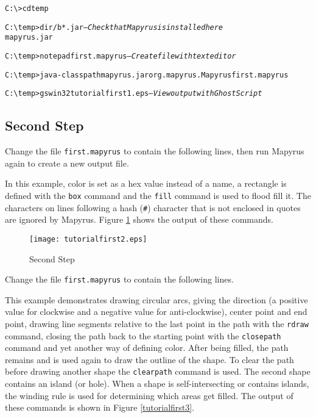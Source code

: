 \begin{alltt}
C:\textbackslash{}>cd temp

C:\textbackslash{}temp>dir /b *.jar \hspace{30pt} \textit{-- Check that Mapyrus is installed here}
mapyrus.jar

C:\textbackslash{}temp>notepad first.mapyrus \hspace{30pt} \textit{-- Create file with text editor}

C:\textbackslash{}temp>java -classpath mapyrus.jar org.mapyrus.Mapyrus first.mapyrus

C:\textbackslash{}temp>gswin32 tutorialfirst1.eps \hspace{30pt} \textit{-- View output with GhostScript}
\end{alltt}

\subsection{Second Step}

Change the file \texttt{first.mapyrus} to contain the following lines,
then run Mapyrus again to create a new output file.



In this example, color is set as a hex value instead of a name,
a rectangle is defined with the \texttt{box} command
and the \texttt{fill} command is used to
flood fill it.
The characters on lines following a hash (\texttt{\#}) character that
is not enclosed in quotes are ignored by Mapyrus.
Figure \ref{tutorialfirst2} shows the output of these commands.

\begin{figure}[htb]
\texttt{[image: tutorialfirst2.eps]}
\caption{Second Step}
\label{tutorialfirst2}
\end{figure}

Change the file \texttt{first.mapyrus} to contain the following lines.



This example demonstrates drawing circular arcs,
giving the direction (a positive value for clockwise and a negative
value for anti-clockwise), center point and end point,
drawing line segments relative to the last point in the path
with the \texttt{rdraw} command,
closing the path back to the starting point
with the \texttt{closepath} command and
yet another way of defining color.
After being filled, the path remains and is used again to draw the outline
of the shape.
To clear the path before drawing another shape the
\texttt{clearpath}
command is used.
The second shape contains an island (or hole).  When a shape is
self-intersecting or contains islands, the winding rule is
used for determining which areas get filled.
The output of these commands is shown in Figure \ref{tutorialfirst3}.

